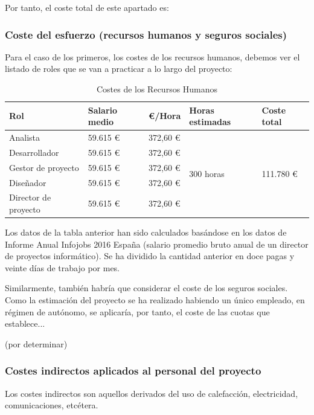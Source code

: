 \documentclass[twoside]{report}
\begin{document}
Por tanto, el coste total de este apartado es: 

\subsubsection{Coste del esfuerzo (recursos humanos y seguros sociales)}

Para el caso de los primeros, los costes de los recursos humanos, debemos ver el listado de roles que se van a practicar a lo largo del proyecto:

\begin{table}[H]
\center
\begin{tabular}{|l|l|l|l|l|}
\hline
Rol                & Salario medio & \euro/Hora   & Horas estimadas & Coste total \\ \hline
Analista           & 59.615 \euro      & 372,60 \euro & \multirow{5}{*}{300 horas} & \multirow{5}{*}{111.780 \euro} \\\cline{1-3}
Desarrollador      & 59.615 \euro      & 372,60 \euro  \\\cline{1-3}
Gestor de proyecto & 59.615 \euro      & 372,60 \euro \\ \cline{1-3}
Diseñador          & 59.615 \euro      & 372,60 \euro \\ \cline{1-3}
Director de proyecto & 59.615 \euro    & 372,60 \euro \\ \cline{1-3}
\hline
\end{tabular}
\caption{Costes de los Recursos Humanos}
\end{table}

Los datos de la tabla anterior han sido calculados basándose en los datos de \cite{infojobs2016} Informe Anual Infojobs 2016 España (salario promedio bruto anual de un director de proyectos informático). Se ha dividido la cantidad anterior en doce pagas y veinte días de trabajo por mes.

Similarmente, también habría que considerar el coste de los seguros sociales. Como la estimación del proyecto se ha realizado  habiendo un único empleado, en régimen de autónomo, se aplicaría, por tanto, el coste de las cuotas que establece...

(por determinar)

\subsubsection{Costes indirectos aplicados al personal del proyecto}

Los costes indirectos son aquellos derivados del uso de calefacción, electricidad, comunicaciones, etcétera.
\end{document}
